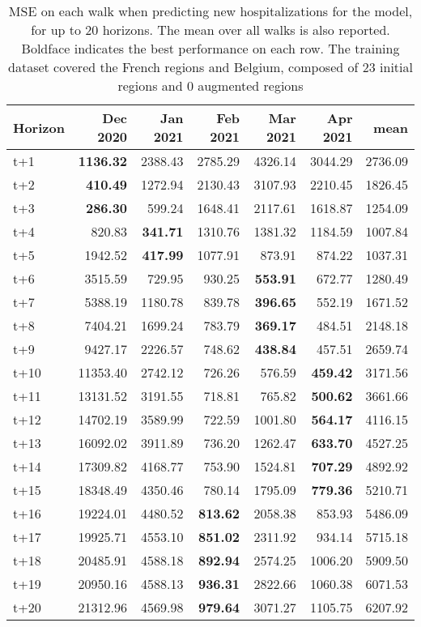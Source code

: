 \begin{table}[H]
\centering
\caption{MSE on each walk when predicting new hospitalizations for the model, for up to 20 horizons. The mean over all walks is also reported. Boldface indicates the best performance on each row. The training dataset covered the French regions and Belgium, composed of 23 initial regions and 0 augmented regions }
\label{tab:MSE_walk_encoder_decoder}
\begin{tabular}{lrrrrrr}
\toprule
Horizon &  Dec 2020 &  Jan 2021 &  Feb 2021 &  Mar 2021 &  Apr 2021 &    mean \\
\midrule
t+1  & \textbf{1136.32}  & 2388.43  & 2785.29  & 4326.14  & 3044.29  & 2736.09  \\
t+2  & \textbf{410.49}  & 1272.94  & 2130.43  & 3107.93  & 2210.45  & 1826.45  \\
t+3  & \textbf{286.30}  & 599.24  & 1648.41  & 2117.61  & 1618.87  & 1254.09  \\
t+4  & 820.83  & \textbf{341.71}  & 1310.76  & 1381.32  & 1184.59  & 1007.84  \\
t+5  & 1942.52  & \textbf{417.99}  & 1077.91  & 873.91  & 874.22  & 1037.31  \\
t+6  & 3515.59  & 729.95  & 930.25  & \textbf{553.91}  & 672.77  & 1280.49  \\
t+7  & 5388.19  & 1180.78  & 839.78  & \textbf{396.65}  & 552.19  & 1671.52  \\
t+8  & 7404.21  & 1699.24  & 783.79  & \textbf{369.17}  & 484.51  & 2148.18  \\
t+9  & 9427.17  & 2226.57  & 748.62  & \textbf{438.84}  & 457.51  & 2659.74  \\
t+10  & 11353.40  & 2742.12  & 726.26  & 576.59  & \textbf{459.42}  & 3171.56  \\
t+11  & 13131.52  & 3191.55  & 718.81  & 765.82  & \textbf{500.62}  & 3661.66  \\
t+12  & 14702.19  & 3589.99  & 722.59  & 1001.80  & \textbf{564.17}  & 4116.15  \\
t+13  & 16092.02  & 3911.89  & 736.20  & 1262.47  & \textbf{633.70}  & 4527.25  \\
t+14  & 17309.82  & 4168.77  & 753.90  & 1524.81  & \textbf{707.29}  & 4892.92  \\
t+15  & 18348.49  & 4350.46  & 780.14  & 1795.09  & \textbf{779.36}  & 5210.71  \\
t+16  & 19224.01  & 4480.52  & \textbf{813.62}  & 2058.38  & 853.93  & 5486.09  \\
t+17  & 19925.71  & 4553.10  & \textbf{851.02}  & 2311.92  & 934.14  & 5715.18  \\
t+18  & 20485.91  & 4588.18  & \textbf{892.94}  & 2574.25  & 1006.20  & 5909.50  \\
t+19  & 20950.16  & 4588.13  & \textbf{936.31}  & 2822.66  & 1060.38  & 6071.53  \\
t+20  & 21312.96  & 4569.98  & \textbf{979.64}  & 3071.27  & 1105.75  & 6207.92  \\

\bottomrule
\end{tabular}
\end{table}
